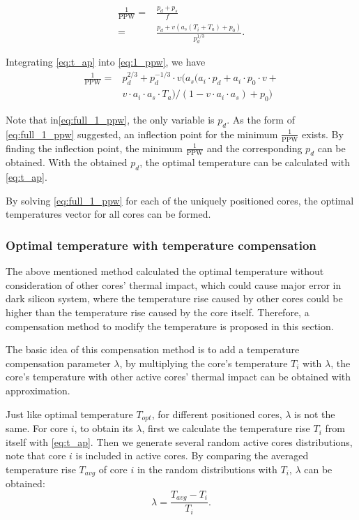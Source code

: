 \begin{equation}\label{eq:1_ppw}
\begin{split}
\frac{1}{\text{PPW}}=&\frac{p_{d}+p_{s}}{f}\\
=&\frac{p_{d}+v(a_{s}(T_{i}+T_{a})+p_{0})}{p_{d}^{1/3}}.
\end{split}
\end{equation}

Integrating \eqref{eq:t_ap} into \eqref{eq:1_ppw}, we have
\begin{equation}\label{eq:full_1_ppw}
\begin{split}
\frac{1}{\text{PPW}}=&p_{d}^{2/3}+p_{d}^{-1/3}\cdot v(a_{s}(a_{i} \cdot p_{d}+a_{i} \cdot p_{0} \cdot v+\\
&v \cdot a_{i} \cdot a_{s} \cdot T_{a})/(1-v \cdot a_{i} \cdot a_{s})+p_{0})
\end{split}
\end{equation}

Note that in\eqref{eq:full_1_ppw}, the only variable is $p_{d}$. As the form of \eqref{eq:full_1_ppw} suggested, an inflection point for the minimum $\frac{1}{\text{PPW}}$ exists. By finding the inflection point, the minimum $\frac{1}{\text{PPW}}$ and the corresponding $p_{d}$ can be obtained. With the obtained $p_{d}$, the optimal temperature can be calculated with \eqref{eq:t_ap}.

By solving \eqref{eq:full_1_ppw} for each of the uniquely positioned cores, the optimal temperatures vector for all cores can be formed.


\subsubsection{Optimal temperature with temperature compensation}
The above mentioned method calculated the optimal temperature without consideration of other cores' thermal impact, which could cause major error in dark silicon system, where the temperature rise caused by other cores could be higher than the temperature rise caused by the core itself. Therefore, a compensation method to modify the temperature is proposed in this section.

The basic idea of this compensation method is to add a temperature compensation parameter $\lambda$, by multiplying the core's temperature $T_{i}$ with $\lambda$, the core's temperature with other active cores' thermal impact can be obtained with approximation.

Just like optimal temperature $T_{opt}$, for different positioned cores, $\lambda$ is not the same. For core $i$, to obtain its $\lambda$, first we calculate the temperature rise $T_{i}$ from itself with \eqref{eq:t_ap}. Then we generate several random active cores distributions, note that core $i$ is included in active cores. By comparing the averaged temperature rise $T_{avg}$ of core $i$ in the random distributions with $T_{i}$, $\lambda$ can be obtained:
\begin{equation}\label{eq:lambda}
\lambda = \frac{T_{avg}-T_{i}}{T_{i}}.
\end{equation}

